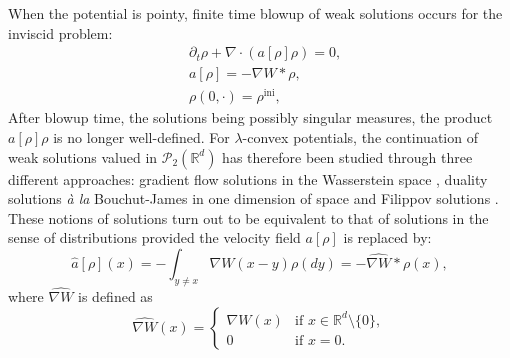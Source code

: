\documentclass[11pt]{article}
\numberwithin{equation}{section}
\newcommand{\ini}{\mathrm{ini}}
\def\RR{\mathbb{R}}
\def\pa{\partial}
\def\calP{{\mathcal P}}
\def\achapo{\widehat{a}}
\def\nabWchapo{\widehat{\nabla W}}
\theoremstyle{plain}
\theoremstyle{definition}
\begin{document}
When the potential is pointy, finite time blowup of weak solutions occurs \cite{BertozziBrandman, bertozzi09} for the inviscid problem:
\begin{subequations}\label{eq:agg}
\begin{align}
& \pa_t \rho + \nabla \cdot (a[\rho] \rho) = 0, \label{eq:rho} \\
& a[\rho] = - \nabla W * \rho, \label{eq:arho} \\
& \rho(0, \cdot) = \rho^{\ini}, \label{eq:rho0}
\end{align}
\end{subequations}
After blowup time, the solutions being possibly singular measures, the product $a[\rho] \rho$ is no longer well-defined. For $\lambda$-convex potentials, the continuation of weak solutions valued in $\calP_2(\RR^d)$ has therefore been studied through three different approaches: gradient flow solutions in the Wasserstein space \cite{figalli11}, duality solutions \textit{à la} Bouchut-James \cite{GF_dual_jv, JVChemotaxis} in one dimension of space and Filippov solutions \cite{cjlv15, lv17}. These notions of solutions turn out to be equivalent to that of solutions in the sense of distributions provided the velocity field $a[\rho]$ is replaced by:
\begin{equation}\label{eq:achapo}
\achapo[\rho](x) = -\int_{y \neq x} \nabla W(x-y) \rho(dy) = -\nabWchapo * \rho (x),
\end{equation}
where $\nabWchapo$ is defined as
\begin{equation*}%
\nabWchapo(x) = 
\begin{cases}
\nabla W(x) &\text{if } x \in \RR^d \setminus \{0\}, \\
0 &\text{if } x = 0.
\end{cases}
\end{equation*}
\end{document}
